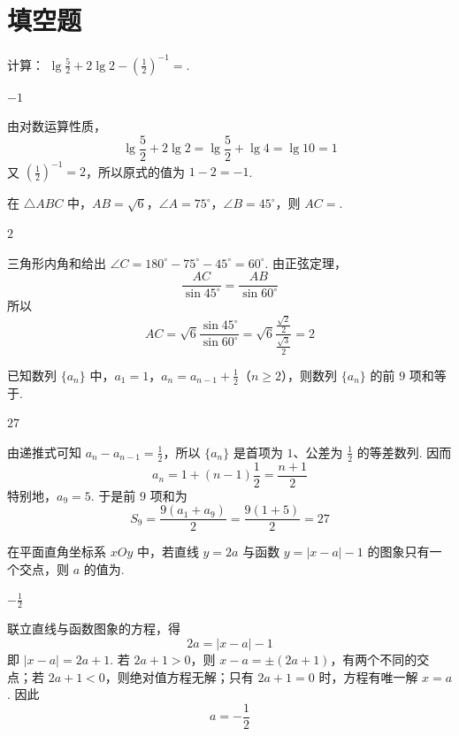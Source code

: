 \section{填空题}

\begin{problem}
计算： \( \lg\frac{5}{2}+2\lg2-\left(\frac{1}{2}\right)^{-1}=\)\fillinblank{}.

\begin{answer}
\(-1\)
\end{answer}

\begin{solution}
由对数运算性质，
\[
\lg\frac52+2\lg2=\lg\frac52+\lg4=\lg10=1
\]
又 \(\left(\frac12\right)^{-1}=2\)，所以原式的值为 \(1-2=-1\).
\end{solution}
\end{problem}

\begin{problem}
在 \(\triangle ABC\) 中，\(AB = \sqrt{6}\)，\(\angle A = 75^{\circ}\)，\(\angle B = 45^{\circ}\)，则 \(AC =\)\fillinblank{}.

\begin{answer}
\(2\)
\end{answer}

\begin{solution}
三角形内角和给出 \(\angle C=180^{\circ}-75^{\circ}-45^{\circ}=60^{\circ}\). 由正弦定理，
\[
\frac{AC}{\sin45^{\circ}}=\frac{AB}{\sin60^{\circ}}
\]
所以
\[
AC=\sqrt6\frac{\sin45^{\circ}}{\sin60^{\circ}}
=\sqrt6\frac{\frac{\sqrt2}{2}}{\frac{\sqrt3}{2}}=2
\]
\end{solution}
\end{problem}

\begin{problem}
已知数列 \( \{a_{n}\} \) 中，\(a_{1}=1\)，\(a_{n}=a_{n-1}+\frac{1}{2}\)（\(n\geqslant2\)），则数列 \( \{a_{n}\} \) 的前 \(9\) 项和等于\fillinblank{}.

\begin{answer}
\(27\)
\end{answer}

\begin{solution}
由递推式可知 \(a_n-a_{n-1}=\frac12\)，所以 \(\{a_n\}\) 是首项为 \(1\)、公差为 \(\frac12\) 的等差数列. 因而
\[
a_n=1+(n-1)\frac12=\frac{n+1}{2}
\]
特别地，\(a_9=5\). 于是前 \(9\) 项和为
\[
S_9=\frac{9(a_1+a_9)}{2}=\frac{9(1+5)}{2}=27
\]
\end{solution}
\end{problem}

\begin{problem}
在平面直角坐标系 \(xOy\) 中，若直线 \(y = 2a\) 与函数 \(y = |x - a| - 1\) 的图象只有一个交点，则 \(a\) 的值为\fillinblank{}.

\begin{answer}
\(-\frac{1}{2}\)
\end{answer}

\begin{solution}
联立直线与函数图象的方程，得
\[
2a=|x-a|-1
\]
即 \(|x-a|=2a+1\). 若 \(2a+1>0\)，则 \(x-a=\pm(2a+1)\)，有两个不同的交点；若 \(2a+1<0\)，则绝对值方程无解；只有 \(2a+1=0\) 时，方程有唯一解 \(x=a\). 因此
\[
a=-\frac12
\]
\end{solution}
\end{problem}

